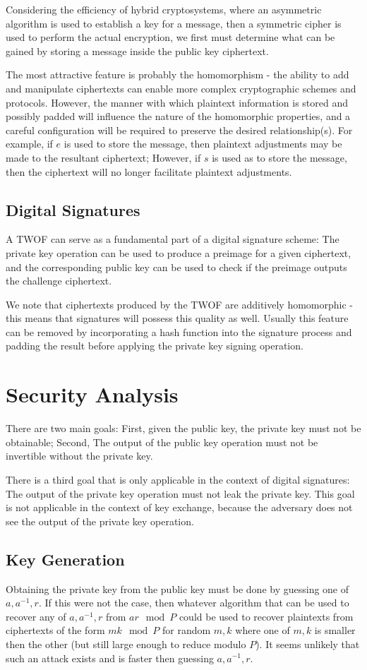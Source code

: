 \documentclass[preprint]{iacrtrans}
\begin{document}
Considering the efficiency of hybrid cryptosystems, where an asymmetric algorithm is used to establish a key for a message, then a symmetric cipher is used to perform the actual encryption, we first must determine what can be gained by storing a message inside the public key ciphertext.

The most attractive feature is probably the homomorphism - the ability to add and manipulate ciphertexts can enable more complex cryptographic schemes and protocols. However, the manner with which plaintext information is stored and possibly padded will influence the nature of the homomorphic properties, and a careful configuration will be required to preserve the desired relationship(s). For example, if $e$ is used to store the message, then plaintext adjustments may be made to the resultant ciphertext; However, if $s$ is used as to store the message, then the ciphertext will no longer facilitate plaintext adjustments.

\subsection{Digital Signatures}
A TWOF can serve as a fundamental part of a digital signature scheme: The private key operation can be used to produce a preimage for a given ciphertext, and the corresponding public key can be used to check if the preimage outputs the challenge ciphertext. 

We note that ciphertexts produced by the TWOF are additively homomorphic - this means that signatures will possess this quality as well. Usually this feature can be removed by incorporating a hash function into the signature process and padding the result before applying the private key signing operation. 

\section{Security Analysis}
There are two main goals: First, given the public key, the private key must not be obtainable; Second, The output of the public key operation must not be invertible without the private key.

There is a third goal that is only applicable in the context of digital signatures: The output of the private key operation must not leak the private key. This goal is not applicable in the context of key exchange, because the adversary does not see the output of the private key operation.

\subsection{Key Generation}
Obtaining the private key from the public key must be done by guessing one of $a, a^{-1}, r$. If this were not the case, then whatever algorithm that can be used to recover any of $a, a^{-1}, r$ from $a r \mod P$ could be used to recover plaintexts from ciphertexts of the form $m k \mod P$ for random $m, k$ where one of $m, k$ is smaller then the other (but still large enough to reduce modulo $P$). It seems unlikely that such an attack exists and is faster then guessing $a, a^{-1},  r$. 
\end{document}
